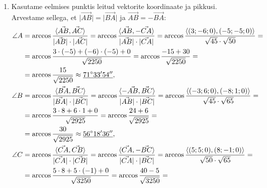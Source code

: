 \documentclass[10pt, a4paper]{article}
\begin{document}
\begin{enumerate}
            \item %
                Kasutame eelmises punktis leitud vektorite koordinaate ja pikkusi.\\ Arvestame sellega, et $\lvert \vec{AB} \rvert = \lvert \vec{BA} \rvert$ ja $\vec{AB} = - \vec{BA}$:
                \begin{align}
                    \nonumber
                    \angle A &= \arccos \frac{\langle \vec{AB}, \vec{AC} \rangle}{\lvert \vec{AB} \rvert \cdot \lvert \vec{AC} \rvert} 
                        = \arccos \frac{\langle \vec{AB}, -\vec{CA} \rangle}{\lvert \vec{AB} \rvert \cdot \lvert \vec{CA} \rvert} 
                        = \arccos \frac{\langle (3; -6; 0), (-5; -5; 0) \rangle}{\sqrt{45} \cdot \sqrt{50}} = \\ \nonumber
                        &= \arccos \frac{3 \cdot (-5) + (-6) \cdot (-5) + 0}{\sqrt{2250}} =
                        \arccos \frac{-15 + 30}{\sqrt{2250}} =\\ \nonumber
                        &=\arccos \frac{15}{\sqrt{2250}} \approx \underline{71\degree 33' 54''},\\ 
                        \nonumber
                    \angle B &= \arccos \frac{\langle \vec{BA}, \vec{BC} \rangle}{\lvert \vec{BA} \rvert \cdot \lvert \vec{BC} \rvert} 
                        = \arccos \frac{\langle -\vec{AB}, \vec{BC} \rangle}{\lvert \vec{AB} \rvert \cdot \lvert \vec{BC} \rvert} 
                        = \arccos \frac{\langle (-3; 6; 0), (-8; 1; 0) \rangle}{\sqrt{45} \cdot \sqrt{65}} = \\ \nonumber
                        &= \arccos \frac{3 \cdot 8 + 6 \cdot 1 + 0}{\sqrt{2925}} =
                        \arccos \frac{24 + 6}{\sqrt{2925}} =\\ \nonumber
                        &=\arccos \frac{30}{\sqrt{2925}} \approx \underline{56\degree 18' 36''},\\ 
                        \nonumber
                    \angle C &= \arccos \frac{\langle \vec{CA}, \vec{CB} \rangle}{\lvert \vec{CA} \rvert \cdot \lvert \vec{CB} \rvert} 
                        = \arccos \frac{\langle \vec{CA}, -\vec{BC} \rangle}{\lvert \vec{CA} \rvert \cdot \lvert \vec{BC} \rvert} 
                        = \arccos \frac{\langle (5; 5; 0), (8; -1; 0) \rangle}{\sqrt{50} \cdot \sqrt{65}} = \\ \nonumber
                        &= \arccos \frac{5 \cdot 8 + 5 \cdot (-1) + 0}{\sqrt{3250}} =
                        \arccos \frac{40 - 5}{\sqrt{3250}} =\\ \nonumber

\end{align}
\end{enumerate}
\end{document}
